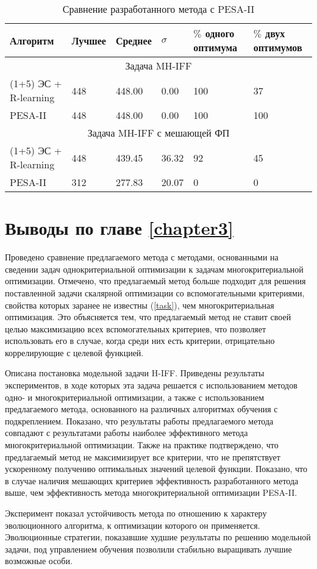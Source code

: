 \begin{table}[ht]
\begin{center}
\caption{Сравнение разработанного метода с PESA-II} \label{pesa-ii}
\begin{tabular}{|l|l|l|l|l|l|}
\hline
Алгоритм & Лучшее & Среднее & $\sigma$ & $\%$ одного оптимума & $\%$ двух оптимумов\\
\hline
\multicolumn{6}{|c|}{Задача MH-IFF}\\ \hline
\rowcolor{light-gray}
(1+5) ЭС + R-learning & 448 & 448.00 & 0.00 & 100 & 37\\
PESA-II & 448 & 448.00 & 0.00 & 100 & 100\\ \hline
\multicolumn{6}{|c|}{Задача MH-IFF с мешающей ФП}\\ \hline
\rowcolor{light-gray}
(1+5) ЭС + R-learning & 448 & 439.45 & 36.32 & 92 & 45\\
PESA-II & 312 & 277.83 & 20.07 & 0 & 0 \\ \hline
\end{tabular}
\end{center}
\end{table}

\section{Выводы по главе \protect\ref{chapter3}}
Проведено сравнение предлагаемого метода с методами, основанными на сведении задач однокритериальной оптимизации к задачам многокритериальной оптимизации. Отмечено, что предлагаемый метод больше подходит для решения поставленной задачи скалярной оптимизации со вспомогательными критериями, свойства которых заранее не известны (\ref{task}), чем многокритериальная оптимизация. Это объясняется тем, что предлагаемый метод не ставит своей целью максимизацию всех вспомогательных критериев, что позволяет использовать его в случае, когда среди них есть критерии, отрицательно коррелирующие с целевой функцией.

Описана постановка модельной задачи H-IFF. Приведены результаты экспериментов, в ходе которых эта задача решается с использованием методов одно- и многокритериальной оптимизации, а также с использованием предлагаемого метода, основанного на различных алгоритмах обучения с подкреплением. Показано, что результаты работы предлагаемого метода совпадают с результатами работы наиболее эффективного метода многокритериальной оптимизации. Также на практике подтверждено, что предлагаемый метод не максимизирует все критерии, что не препятствует ускоренному получению оптимальных значений целевой функции. Показано, что в случае наличия мешающих критериев эффективность разработанного метода выше, чем эффективность метода многокритериальной оптимизации PESA-II.

Эксперимент показал устойчивость метода по отношению к характеру эволюционного алгоритма, к оптимизации которого он применяется. Эволюционные стратегии, показавшие худшие результаты по решению модельной задачи, под управлением обучения позволили стабильно выращивать лучшие возможные особи.
